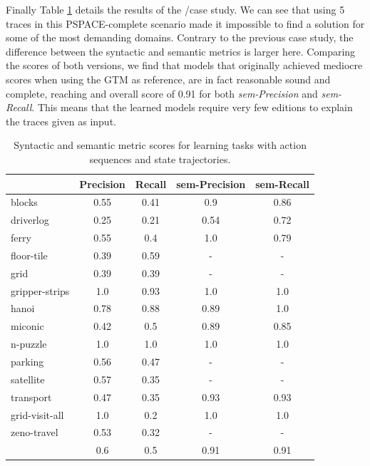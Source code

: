 Finally Table \ref{tab:metric_comparison_0_0} details the results of the \NO/\NO case study. We can see that using 5 traces in this PSPACE-complete scenario made it impossible to find a solution for some of the most demanding domains. Contrary to the previous case study, the difference between the syntactic and semantic metrics is larger here. Comparing the scores of both versions, we find that models that originally achieved mediocre scores when using the GTM as reference, are in fact reasonable sound and complete, reaching and overall score of 0.91 for both {\em sem-Precision} and {\em sem-Recall}. This means that the learned models require very few editions to explain the traces given as input.

\begin{table}[hbt!]
     \begin{footnotesize}
	\begin{center}		
		\begin{tabular}{l|c|c|c|c|}		
			& {\bf Precision} & {\bf Recall} & {\bf sem-Precision} & {\bf sem-Recall} \\
			\hline
			blocks & 0.55 & 0.41 & 0.9 & 0.86 \\
			driverlog & 0.25 & 0.21 & 0.54 & 0.72 \\
			ferry & 0.55 & 0.4 & 1.0 & 0.79 \\
			floor-tile & 0.39 & 0.59 & - & - \\
			grid & 0.39 & 0.39 & - & - \\
			gripper-strips & 1.0 & 0.93 & 1.0 & 1.0 \\
			hanoi & 0.78 & 0.88 & 0.89 & 1.0 \\
			miconic & 0.42 & 0.5 & 0.89 & 0.85 \\
			n-puzzle & 1.0 & 1.0 & 1.0 & 1.0 \\
			parking & 0.56 & 0.47 & - & - \\
			satellite & 0.57 & 0.35 & - & - \\
			transport & 0.47 & 0.35 & 0.93 & 0.93 \\
			grid-visit-all & 1.0 & 0.2 & 1.0 & 1.0 \\
			zeno-travel & 0.53 & 0.32 & - & - \\
			\hline
			& 0.6 & 0.5 & 0.91 & 0.91
		\end{tabular}
	\end{center}
        \end{footnotesize}
	\caption{\small Syntactic and semantic metric scores for learning tasks with \NO action sequences and \NO state trajectories.}
	\label{tab:metric_comparison_0_0}
\end{table}

